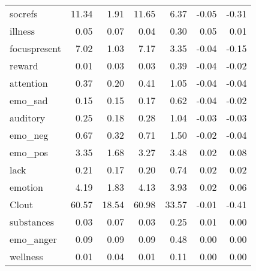 \begin{longtable}{@{}p{3.4cm}rrrrrr@{}}
socrefs & 11.34 & 1.91 & 11.65 & 6.37 & -0.05 & -0.31 \\
illness & 0.05 & 0.07 & 0.04 & 0.30 & 0.05 & 0.01 \\
focuspresent & 7.02 & 1.03 & 7.17 & 3.35 & -0.04 & -0.15 \\
reward & 0.01 & 0.03 & 0.03 & 0.39 & -0.04 & -0.02 \\
attention & 0.37 & 0.20 & 0.41 & 1.05 & -0.04 & -0.04 \\
emo\_sad & 0.15 & 0.15 & 0.17 & 0.62 & -0.04 & -0.02 \\
auditory & 0.25 & 0.18 & 0.28 & 1.04 & -0.03 & -0.03 \\
emo\_neg & 0.67 & 0.32 & 0.71 & 1.50 & -0.02 & -0.04 \\
emo\_pos & 3.35 & 1.68 & 3.27 & 3.48 & 0.02 & 0.08 \\
lack & 0.21 & 0.17 & 0.20 & 0.74 & 0.02 & 0.02 \\
emotion & 4.19 & 1.83 & 4.13 & 3.93 & 0.02 & 0.06 \\
Clout & 60.57 & 18.54 & 60.98 & 33.57 & -0.01 & -0.41 \\
substances & 0.03 & 0.07 & 0.03 & 0.25 & 0.01 & 0.00 \\
emo\_anger & 0.09 & 0.09 & 0.09 & 0.48 & 0.00 & 0.00 \\
wellness & 0.01 & 0.04 & 0.01 & 0.11 & 0.00 & 0.00 \\
\end{longtable}
\endgroup
